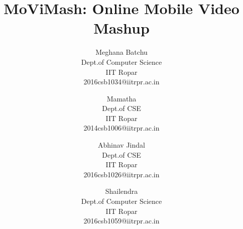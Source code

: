 \documentclass{sig-alternate}
\begin{document}
%





\title{MoViMash: Online Mobile Video Mashup}

%
%
%
%
%

%
\author{{Meghana Batchu}\\
  {Dept.of Computer Science}\\
  {IIT Ropar }\\
  {2016csb1034@iitrpr.ac.in}
  \and
  {Mamatha}\\
{Dept.of CSE}\\
  {IIT Ropar}\\
  {2014csb1006@iitrpr.ac.in}
\and
{Abhinav Jindal}\\
  {Dept.of CSE}\\
  {IIT Ropar}\\
  {2016csb1026@iitrpr.ac.in}
  \and
  {Shailendra}\\
{Dept.of Computer Science}\\
  {IIT Ropar}\\
{2016csb1059@iitrpr.ac.in}}

\date{}
\end{document}
